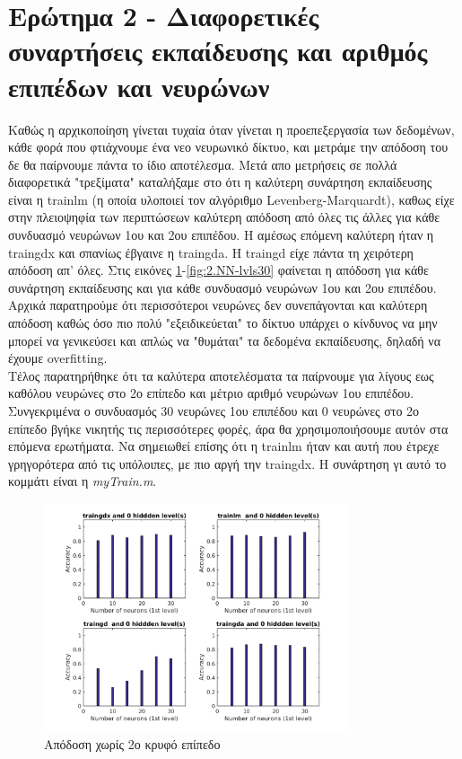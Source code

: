 \documentclass[12pt]{article}
\begin{document}
\section*{Ερώτημα 2 - Διαφορετικές συναρτήσεις εκπαίδευσης και αριθμός επιπέδων και νευρώνων}
Καθώς η αρχικοποίηση γίνεται τυχαία όταν γίνεται η προεπεξεργασία των δεδομένων, κάθε φορά που φτιάχνουμε ένα νεο νευρωνικό δίκτυο, και μετράμε την απόδοση του δε θα παίρνουμε πάντα το ίδιο αποτέλεσμα. Μετά απο μετρήσεις σε πολλά διαφορετικά "τρεξίματα" καταλήξαμε στο ότι η καλύτερη συνάρτηση εκπαίδευσης είναι η trainlm (η οποία υλοποιεί τον αλγόριθμο Levenberg-Marquardt), καθως είχε στην πλειοψηφία των περιπτώσεων καλύτερη απόδοση από όλες τις άλλες για κάθε συνδυασμό νευρώνων 1ου και 2ου επιπέδου. Η αμέσως επόμενη καλύτερη ήταν η traingdx και σπανίως έβγαινε η traingda. Η traingd είχε πάντα τη χειρότερη απόδοση απ' όλες. Στις εικόνες \ref{fig:2.NN-lvls0}-\ref{fig:2.NN-lvls30} φαίνεται η απόδοση για κάθε συνάρτηση εκπαίδευσης και για κάθε συνδυασμό νευρώνων 1ου και 2ου επιπέδου. \\
\noindent
Αρχικά παρατηρούμε ότι περισσότεροι νευρώνες δεν συνεπάγονται και καλύτερη απόδοση καθώς όσο πιο πολύ "εξειδικεύεται" το δίκτυο υπάρχει ο κίνδυνος να μην μπορεί να γενικεύσει και απλώς να "θυμάται" τα δεδομένα εκπαίδευσης, δηλαδή να έχουμε overfitting.\\
Τέλος παρατηρήθηκε ότι τα καλύτερα αποτελέσματα τα παίρνουμε για λίγους εως καθόλου νευρώνες στο 2ο επίπεδο και μέτριο αριθμό νευρώνων 1ου επιπέδου. Συνγεκριμένα ο συνδυασμός 30 νευρώνες 1ου επιπέδου και 0 νευρώνες στο 2ο επίπεδο βγήκε νικητής τις περισσότερες φορές, άρα θα χρησιμοποιήσουμε αυτόν στα επόμενα ερωτήματα. Να σημειωθεί επίσης ότι η trainlm ήταν και αυτή που έτρεχε γρηγορότερα από τις υπόλοιπες, με πιο αργή την traingdx. Η συνάρτηση γι αυτό το κομμάτι είναι η \textit{myTrain.m}.

		\begin{figure}[H]
	 		\centering
			\includegraphics[width=0.8\textwidth]{fakelos/NNlvls-0.png}
			\caption{Απόδοση χωρίς 2ο κρυφό επίπεδο} 	  
			\label{fig:2.NN-lvls0}
		\end{figure}
\end{document}
